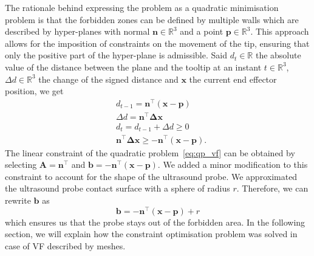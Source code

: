 The rationale behind expressing the problem as a quadratic
minimisation problem is that the forbidden zones can be defined by
multiple walls which are described by hyper-planes with normal
$\boldsymbol{n} \in \mathbb{R}^3$ and a point
$\boldsymbol{p} \in \mathbb{R}^3$. This approach allows for the
imposition of constraints on the movement of the tip, ensuring that
only the positive part of the hyper-plane is admissible. Said
$d_t \in \mathbb{R}$ the absolute value of the distance between the
plane and the tooltip at an instant $t \in \mathbb{R}^3$,
$\Delta d \in \mathbb{R}^3$ the change of the signed distance and
$\boldsymbol{x}$ the current end effector position, we get
\begin{equation}
    \begin{aligned}
        &d_{t-1}= \boldsymbol{n}^{\top}(\boldsymbol{x}-\boldsymbol{p})\\
        &\Delta d = \boldsymbol{n}^{\top}\boldsymbol{\Delta x}\\
        &d_t=d_{t-1} + \Delta d \geq 0\\
        &\boldsymbol{n}^{\top}\boldsymbol{\Delta x}\geq-\boldsymbol{n}^{\top}(\boldsymbol{x}-\boldsymbol{p}).
    \end{aligned}
\end{equation}
The linear constraint of the quadratic problem~\eqref{eq:qp_vf} can be
obtained by selecting $\boldsymbol{A} = \boldsymbol{n}^{\top}$ and
$\boldsymbol{b} =
-\boldsymbol{n}^{\top}(\boldsymbol{x}-\boldsymbol{p})$. We added a
minor modification to this constraint to account for the shape of the
ultrasound probe. We approximated the ultrasound probe contact surface
with a sphere of radius $r$. Therefore, we can rewrite
$\boldsymbol{b}$ as \begin{equation} \boldsymbol{b} =
  -\boldsymbol{n}^{\top}(\boldsymbol{x} - \boldsymbol{p}) + r
\end{equation}
which ensures us that the probe stays out of the forbidden area. In the following section, we will explain how the constraint optimisation problem was solved in case of VF described by meshes.

